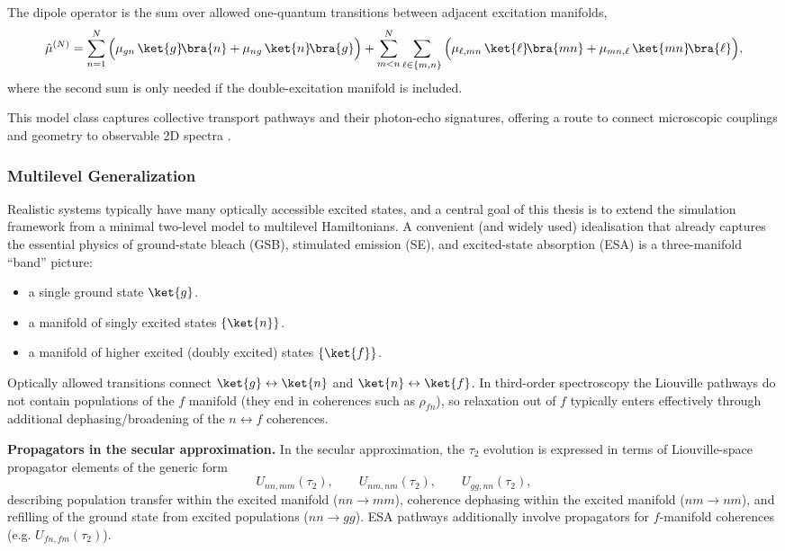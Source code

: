 The dipole operator is the sum over allowed one-quantum transitions between adjacent excitation manifolds,
\begin{equation*}
	\hat{\mu}^{(N)}
	= \sum_{n=1}^{N} \Big(\mu_{gn}\,\ket{g}\!\bra{n} + \mu_{ng}\,\ket{n}\!\bra{g}\Big)
	+ \sum_{m<n}^{N} \sum_{\ell\in\{m,n\}} \Big(\mu_{\ell,mn}\,\ket{\ell}\!\bra{mn} + \mu_{mn,\ell}\,\ket{mn}\!\bra{\ell}\Big),
\end{equation*}
where the second sum is only needed if the double-excitation manifold is included.


This model class captures collective transport pathways and their photon-echo signatures, offering a route to connect microscopic couplings and geometry to observable 2D spectra \cite{kalraetal2023electronicenergymigration}.




\subsubsection{Multilevel Generalization}
\label{sec:model_multilevel_generalization}
Realistic systems typically have many optically accessible excited states, and a central goal of this thesis is to extend the simulation framework from a minimal two-level model to multilevel Hamiltonians. A convenient (and widely used) idealisation that already captures the essential physics of ground-state bleach (GSB), stimulated emission (SE), and excited-state absorption (ESA) is a three-manifold ``band'' picture:
\begin{itemize}
	\item a single ground state $\ket{g}$.
	\item a manifold of singly excited states $\{\ket{n}\}$.
	\item a manifold of higher excited (doubly excited) states $\{\ket{f}\}$.
\end{itemize}
Optically allowed transitions connect $\ket{g}\leftrightarrow\ket{n}$ and $\ket{n}\leftrightarrow\ket{f}$. In third-order spectroscopy the Liouville pathways do not contain populations of the $f$ manifold (they end in coherences such as $\rho_{fn}$), so relaxation out of $f$ typically enters effectively through additional dephasing/broadening of the $n\leftrightarrow f$ coherences.

\medskip

\textbf{Propagators in the secular approximation.}
In the secular approximation, the $\tau_2$ evolution is expressed in terms of Liouville-space propagator elements of the generic form
\begin{equation*}
	U_{nn,mm}(\tau_2),\qquad U_{nm,nm}(\tau_2),\qquad U_{gg,nn}(\tau_2),
\end{equation*}
describing population transfer within the excited manifold ($nn\to mm$), coherence dephasing within the excited manifold ($nm\to nm$), and refilling of the ground state from excited populations ($nn\to gg$). ESA pathways additionally involve propagators for $f$-manifold coherences (e.g. $U_{fn,fm}(\tau_2)$).


